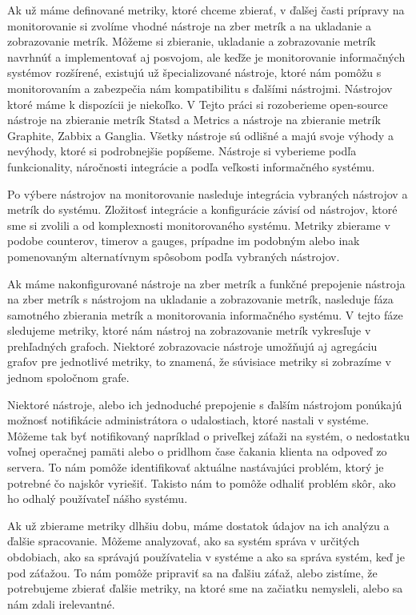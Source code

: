 \documentclass[a4paper, usesections, upjsfrontpage, disablespecwarning, thesismargins, thesislinespacing]{rnthesissvk}
\begin{document}
Ak už máme definované metriky, ktoré chceme zbierať, v ďalšej časti prípravy na monitorovanie si zvolíme vhodné nástroje na zber 	metrík a na ukladanie a zobrazovanie metrík.
Môžeme si zbieranie, ukladanie a zobrazovanie metrík navrhnúť a implementovať aj posvojom, ale keďže je monitorovanie informačných systémov rozšírené, existujú už špecializované nástroje, ktoré nám pomôžu s monitorovaním a zabezpečia nám kompatibilitu s ďalšími nástrojmi.
Nástrojov ktoré máme k dispozícii je niekoľko.
V Tejto práci si rozoberieme open-source nástroje na zbieranie metrík Statsd a Metrics a nástroje na zbieranie metrík Graphite, Zabbix a Ganglia.
Všetky nástroje sú odlišné a majú svoje výhody a nevýhody, ktoré si podrobnejšie popíšeme.
Nástroje si vyberieme podľa funkcionality, náročnosti integrácie a podľa veľkosti informačného systému.

Po výbere nástrojov na monitorovanie nasleduje integrácia vybraných nástrojov a metrík do systému.
Zložitosť integrácie a konfigurácie závisí od nástrojov, ktoré sme si zvolili a od komplexnosti monitorovaného systému.
Metriky zbierame v podobe counterov, timerov a gauges, prípadne im podobným alebo inak pomenovaným alternatívnym spôsobom podľa vybraných nástrojov.

Ak máme nakonfigurované nástroje na zber metrík a funkčné prepojenie nástroja na zber metrík s nástrojom na ukladanie a zobrazovanie metrík, nasleduje fáza samotného zbierania metrík a monitorovania informačného systému.
V tejto fáze sledujeme metriky, ktoré nám nástroj na zobrazovanie metrík vykresľuje v prehľadných grafoch.
Niektoré zobrazovacie nástroje umožňujú aj agregáciu grafov pre jednotlivé metriky, to znamená, že súvisiace metriky si zobrazíme v jednom spoločnom grafe. 

Niektoré nástroje, alebo ich jednoduché prepojenie s ďalším nástrojom ponúkajú možnosť notifikácie administrátora o udalostiach, ktoré nastali v systéme.
Môžeme tak byť notifikovaný napríklad o priveľkej záťaži na systém, o nedostatku voľnej operačnej pamäti alebo o pridlhom čase čakania klienta na odpoveď zo servera.
To nám pomôže identifikovať aktuálne nastávajúci problém, ktorý je potrebné čo najskôr vyriešiť.
Takisto nám to pomôže odhaliť problém skôr, ako ho odhalý používateľ nášho systému.

Ak už zbierame metriky dlhšiu dobu, máme dostatok údajov na ich analýzu a ďalšie spracovanie.
Môžeme analyzovať, ako sa systém správa v určitých obdobiach, ako sa správajú používatelia v systéme a ako sa správa systém, keď je pod záťažou. To nám pomôže pripraviť sa na ďalšiu záťaž, alebo zistíme, že potrebujeme zbierať ďalšie metriky, na ktoré sme na začiatku nemysleli, alebo sa nám zdali irelevantné.
\end{document}
